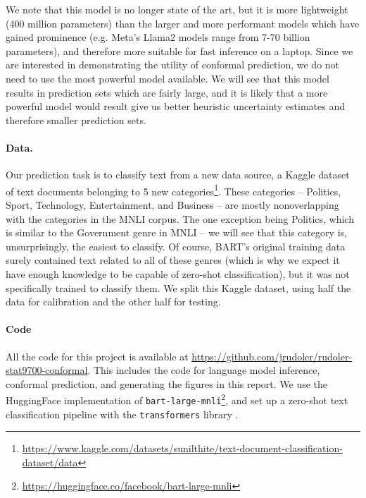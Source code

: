 \documentclass[a4paper, 12pt]{article}
\begin{document}
We note that this model is no longer state of the art, but it is more lightweight (400 million parameters) than the larger and more performant models which have gained prominence (e.g. Meta's Llama2 models range from 7-70 billion parameters), and therefore more suitable for fast inference on a laptop.
Since we are interested in demonstrating the utility of conformal prediction, we do not need to use the most powerful model available.
We will see that this model results in prediction sets which are fairly large, and it is likely that a more powerful model would result give us better heuristic uncertainty estimates and therefore smaller prediction sets.


\paragraph*{Data.} Our prediction task is to classify text from a new data source, a Kaggle dataset of text documents belonging to 5 new categories\footnote{\url{https://www.kaggle.com/datasets/sunilthite/text-document-classification-dataset/data}}. These categories -- Politics, Sport, Technology, Entertainment, and Business -- are mostly nonoverlapping with the categories in the MNLI corpus. The one exception being Politics, which is similar to the Government genre in MNLI -- we will see that this category is, unsurprisingly, the easiest to classify. Of course, BART's original training data surely contained text related to all of these genres (which is why we expect it have enough knowledge to be capable of zero-shot classification), but it was not specifically trained to classify them. We split this Kaggle dataset, using half the data for calibration and the other half for testing.

\paragraph*{Code} All the code for this project is available at \url{https://github.com/jrudoler/rudoler-stat9700-conformal}. This includes the code for language model inference, conformal prediction, and generating the figures in this report. We use the HuggingFace implementation of \texttt{bart-large-mnli}\footnote{\url{https://huggingface.co/facebook/bart-large-mnli}}, and set up a zero-shot text classification pipeline with the \texttt{transformers} library \autocite{wolfHuggingFaceTransformersStateoftheart2019}.
\end{document}
